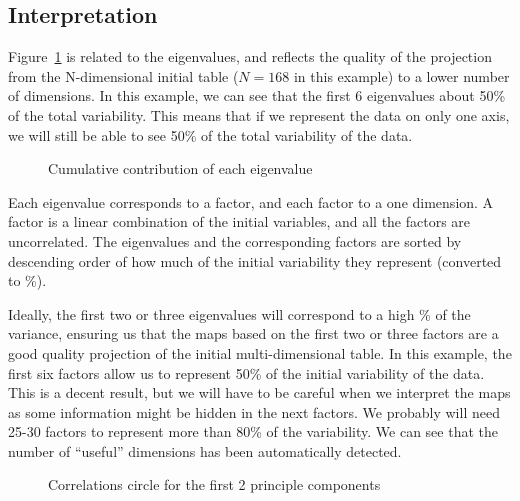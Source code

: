 \documentclass[paper=letter, fontsize=11pt, onecolunm, twoside]{scrartcl}
\begin{document}
\subsection{Interpretation}
Figure~\ref{fig:cumcon} is related to the eigenvalues, and reflects
the quality of the projection from the N-dimensional initial table
($N=168$ in this example) to a lower number of dimensions. In this
example, we can see that the first 6 eigenvalues about 50\% of the
total variability. This means that if we represent the data on only
one axis, we will still be able to see 50\% of the total variability
of the data.

\begin{figure}
\caption{Cumulative contribution of each eigenvalue}
\label{fig:cumcon}
\end{figure}


Each eigenvalue corresponds to a factor, and each factor to a one
dimension. A factor is a linear combination of the initial variables,
and all the factors are uncorrelated. The eigenvalues and the
corresponding factors are sorted by descending order of how much of
the initial variability they represent (converted to \%).


Ideally, the first two or three eigenvalues will correspond to a high
\% of the variance, ensuring us that the maps based on the first two
or three factors are a good quality projection of the initial
multi-dimensional table. In this example, the first six factors allow
us to represent 50\% of the initial variability of the data.  This is
a decent result, but we will have to be careful when we interpret the
maps as some information might be hidden in the next factors. We
probably will need 25-30 factors to represent more than 80\% of the
variability. We can see that the number of ``useful'' dimensions has
been automatically detected.


\begin{figure}
\caption{Correlations circle for the first 2 principle components}
\label{fig:correlationcircle}
\end{figure}
\end{document}
